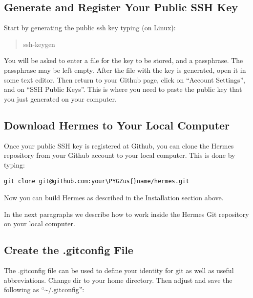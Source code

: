 \documentclass[a4paper,0pt,english]{sphinxmanual}
\def\PYGZus{\char`\_}
\begin{document}
\subsection{Generate and Register Your Public SSH Key}
\label{src/collaboration:generate-and-register-your-public-ssh-key}
Start by generating the public ssh key typing (on Linux):
\begin{quote}

ssh-keygen
\end{quote}

You will be asked to enter a file for the key to be stored, and
a passphrase. The passphrase may be left empty. After the file with
the key is generated, open it in some text editor. Then return to your
Github page, click on ``Account Settings'', and on ``SSH Public Keys''.
This is where you need to paste the public key that you just generated
on your computer.


\subsection{Download Hermes to Your Local Computer}
\label{src/collaboration:download-hermes-to-your-local-computer}
Once your public SSH key is registered at Github, you can
clone the Hermes repository from your Github account to
your local computer. This is done by typing:

\begin{Verbatim}[commandchars=\\\{\}]
git clone git@github.com:your\PYGZus{}name/hermes.git
\end{Verbatim}

Now you can build Hermes as described in the Installation
section above.

In the next paragraphs we describe how to work inside
the Hermes Git repository on your local computer.


\subsection{Create the .gitconfig File}
\label{src/collaboration:create-the-gitconfig-file}
The .gitconfig file can be used to define your identity
for git as well as useful abbreviations. Change dir to your
home directory. Then adjust and save the following as
``\textasciitilde{}/.gitconfig'':
\end{document}
